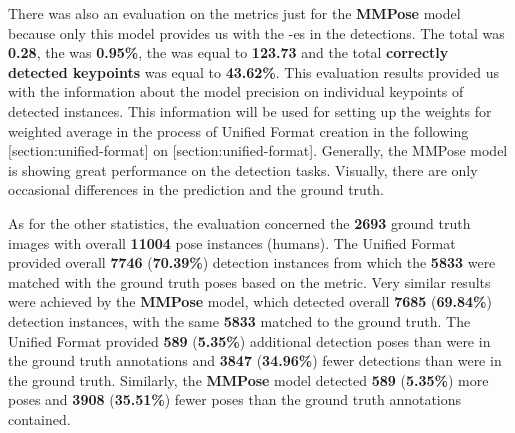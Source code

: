 
There was also an evaluation on the metrics just for the {\bf MMPose} model because only this model provides us with the \BBOX\--es in the detections. The total {\bf \OKS} was {\bf 0.28}, the {\bf \APE} was {\bf 0.95\%}, the {\bf \MSE} was equal to {\bf 123.73} and the total {\bf correctly detected keypoints} was equal to {\bf 43.62\%}. This evaluation results provided us with the information about the model precision on individual keypoints of detected instances. This information will be used for setting up the weights for weighted average in the process of Unified Format creation in the following [section:unified-format] on [section:unified-format]. Generally, the MMPose model is showing great performance on the detection tasks. Visually, there are only occasional differences in the prediction and the ground truth.

As for the other statistics, the evaluation concerned the {\bf 2693} ground truth images with overall {\bf 11004} pose instances (humans). The Unified Format provided overall {\bf 7746} ({\bf 70.39\%}) detection instances from which the {\bf 5833} were matched with the ground truth poses based on the {\bf \IoU} metric. Very similar results were achieved by the {\bf MMPose} model, which detected overall {\bf 7685} ({\bf 69.84\%}) detection instances, with the same {\bf 5833} matched to the ground truth. The Unified Format provided {\bf 589} ({\bf 5.35\%}) additional detection poses than were in the ground truth annotations and {\bf 3847} ({\bf 34.96\%}) fewer detections than were in the ground truth. Similarly, the {\bf MMPose} model detected {\bf 589} ({\bf 5.35\%}) more poses and {\bf 3908} ({\bf 35.51\%}) fewer poses than the ground truth annotations contained.

